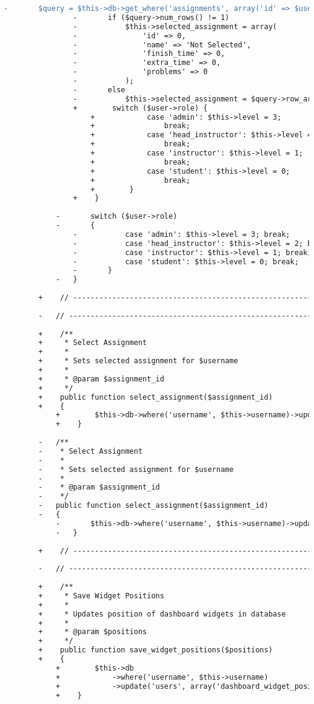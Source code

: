\begin{lstlisting}[language=diff, caption=Perubahan pada kode User.php]
				-		$query = $this->db->get_where('assignments', array('id' => $user->selected_assignment));
				-		if ($query->num_rows() != 1)
				-			$this->selected_assignment = array(
				-				'id' => 0,
				-				'name' => 'Not Selected',
				-				'finish_time' => 0,
				-				'extra_time' => 0,
				-				'problems' => 0
				-			);
				-		else
				-			$this->selected_assignment = $query->row_array();
				+        switch ($user->role) {
					+            case 'admin': $this->level = 3;
					+                break;
					+            case 'head_instructor': $this->level = 2;
					+                break;
					+            case 'instructor': $this->level = 1;
					+                break;
					+            case 'student': $this->level = 0;
					+                break;
					+        }
				+    }
			
			-		switch ($user->role)
			-		{
				-			case 'admin': $this->level = 3; break;
				-			case 'head_instructor': $this->level = 2; break;
				-			case 'instructor': $this->level = 1; break;
				-			case 'student': $this->level = 0; break;
				-		}
			-	}
		
		+    // ------------------------------------------------------------------------
		
		-	// ------------------------------------------------------------------------
		
		+    /**
		+     * Select Assignment
		+     *
		+     * Sets selected assignment for $username
		+     *
		+     * @param $assignment_id
		+     */
		+    public function select_assignment($assignment_id)
		+    {
			+        $this->db->where('username', $this->username)->update('users', array('selected_assignment' => $assignment_id));
			+    }
		
		-	/**
		-	 * Select Assignment
		-	 *
		-	 * Sets selected assignment for $username
		-	 *
		-	 * @param $assignment_id
		-	 */
		-	public function select_assignment($assignment_id)
		-	{
			-		$this->db->where('username', $this->username)->update('users', array('selected_assignment'=>$assignment_id));
			-	}
		
		+    // ------------------------------------------------------------------------
		
		-	// ------------------------------------------------------------------------
		
		+    /**
		+     * Save Widget Positions
		+     *
		+     * Updates position of dashboard widgets in database
		+     *
		+     * @param $positions
		+     */
		+    public function save_widget_positions($positions)
		+    {
			+        $this->db
			+            ->where('username', $this->username)
			+            ->update('users', array('dashboard_widget_positions' => $positions));
			+    }
		

\end{lstlisting}
